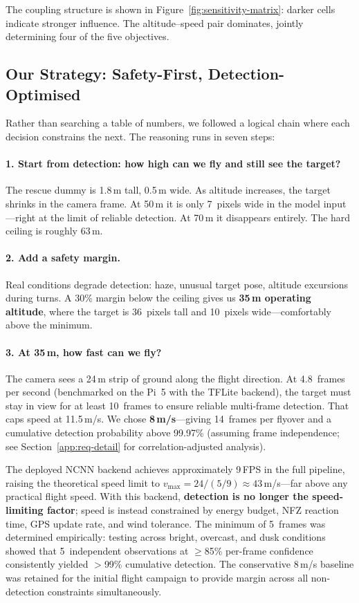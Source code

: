 The coupling structure is shown in Figure~\ref{fig:sensitivity-matrix}: darker cells indicate stronger influence. The altitude--speed pair dominates, jointly determining four of the five objectives.

\subsection{Our Strategy: Safety-First, Detection-Optimised}\label{sec:df-strategy}

Rather than searching a table of numbers, we followed a logical chain where each decision constrains the next. The reasoning runs in seven steps:

\paragraph{1. Start from detection: how high can we fly and still see the target?}
The rescue dummy is 1.8\,m tall, 0.5\,m wide. As altitude increases, the target shrinks in the camera frame. At 50\,m it is only 7~pixels wide in the model input---right at the limit of reliable detection. At 70\,m it disappears entirely. The hard ceiling is roughly 63\,m.

\paragraph{2. Add a safety margin.}
Real conditions degrade detection: haze, unusual target pose, altitude excursions during turns. A 30\% margin below the ceiling gives us \textbf{35\,m operating altitude}, where the target is 36~pixels tall and 10~pixels wide---comfortably above the minimum.

\paragraph{3. At 35\,m, how fast can we fly?}
The camera sees a 24\,m strip of ground along the flight direction. At 4.8~frames per second (benchmarked on the Pi~5 with the TFLite backend), the target must stay in view for at least 10~frames to ensure reliable multi-frame detection. That caps speed at 11.5\,m/s. We chose \textbf{8\,m/s}---giving 14~frames per flyover and a cumulative detection probability above 99.97\% (assuming frame independence; see Section~\ref{app:req-detail} for correlation-adjusted analysis).

The deployed NCNN backend achieves approximately 9\,FPS in the full pipeline, raising the theoretical speed limit to $v_\text{max} = 24 / (5/9) \approx 43$\,m/s---far above any practical flight speed. With this backend, \textbf{detection is no longer the speed-limiting factor}; speed is instead constrained by energy budget, NFZ reaction time, GPS update rate, and wind tolerance. The minimum of 5~frames was determined empirically: testing across bright, overcast, and dusk conditions showed that 5~independent observations at $\geq$85\% per-frame confidence consistently yielded $>$99\% cumulative detection. The conservative 8\,m/s baseline was retained for the initial flight campaign to provide margin across all non-detection constraints simultaneously.

